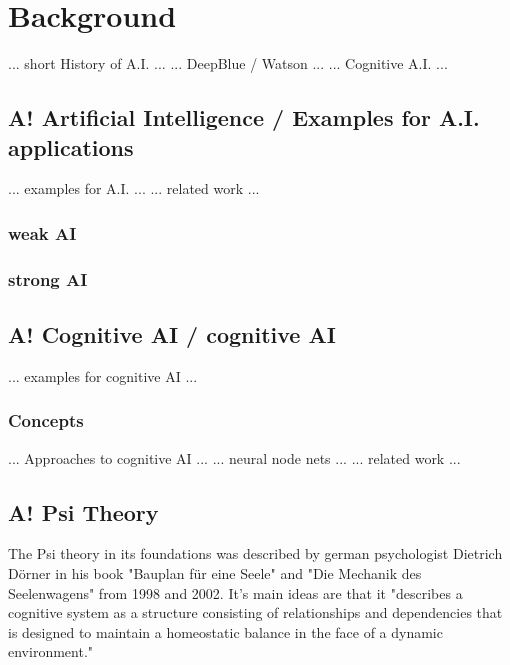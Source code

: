 \chapter{Background}

... short History of A.I. ...
... DeepBlue / Watson ...
... Cognitive A.I. ...

\section{A! Artificial Intelligence / Examples for A.I. applications}
... examples for A.I. ...
... related work ...

\subsection{weak AI}

\subsection{strong AI}

\section{A! Cognitive AI / cognitive AI}
... examples for cognitive AI ...

\subsection{Concepts}

... Approaches to cognitive AI ...
... neural node nets ...
... related work ...

\section{A! Psi Theory}
The Psi theory in its foundations was described by german psychologist Dietrich Dörner in his book "Bauplan für eine Seele" and "Die Mechanik des Seelenwagens" from 1998 and 2002. It's main ideas are that it "describes a cognitive system as a structure consisting of relationships and dependencies that is designed to maintain a homeostatic balance in the face of a dynamic environment."


